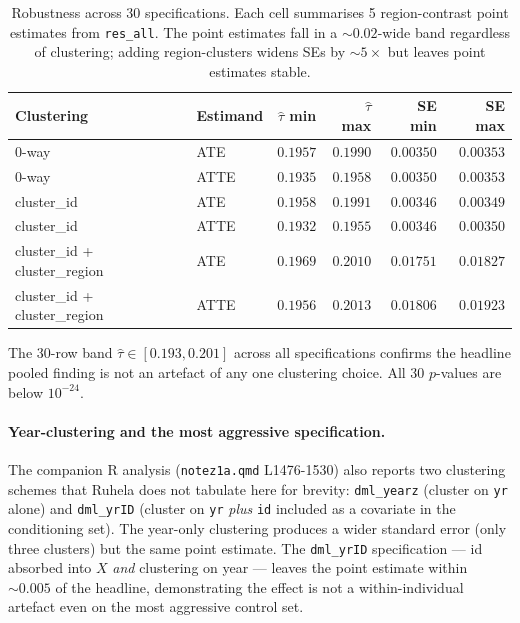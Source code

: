 \documentclass[11pt,a4paper]{article}
\newcommand{\1}{\mathbf{1}}
\theoremstyle{plain}
\theoremstyle{definition}
\begin{document}
\begin{table}[h]
\centering\small
\caption{Robustness across 30 specifications.  Each cell summarises 5
region-contrast point estimates from \texttt{res\_all}.  The point
estimates fall in a $\sim 0.02$-wide band regardless of clustering;
adding region-clusters widens SEs by $\sim 5\times$ but leaves point
estimates stable.}\label{tab:res-all-summary}
\begin{tabular}{llrrrr}
\toprule
Clustering & Estimand & $\hat\tau$ min & $\hat\tau$ max & SE min & SE max\\\midrule
0-way                              & ATE  & $0.1957$ & $0.1990$ & $0.00350$ & $0.00353$\\
0-way                              & ATTE & $0.1935$ & $0.1958$ & $0.00350$ & $0.00353$\\
cluster\_id                        & ATE  & $0.1958$ & $0.1991$ & $0.00346$ & $0.00349$\\
cluster\_id                        & ATTE & $0.1932$ & $0.1955$ & $0.00346$ & $0.00350$\\
cluster\_id + cluster\_region       & ATE  & $0.1969$ & $0.2010$ & $0.01751$ & $0.01827$\\
cluster\_id + cluster\_region       & ATTE & $0.1956$ & $0.2013$ & $0.01806$ & $0.01923$\\
\bottomrule
\end{tabular}
\end{table}

The 30-row band $\widehat\tau \in [0.193, 0.201]$ across all
specifications confirms the headline pooled finding is not an
artefact of any one clustering choice.  All 30 $p$-values are below
$10^{-24}$.

\paragraph{Year-clustering and the most aggressive specification.}
The companion R analysis (\texttt{notez1a.qmd} L1476-1530) also
reports two clustering schemes that Ruhela does not tabulate here for
brevity: \texttt{dml\_yearz} (cluster on \texttt{yr} alone) and
\texttt{dml\_yrID} (cluster on \texttt{yr} \emph{plus}
\texttt{id} included as a covariate in the conditioning set).  The
year-only clustering produces a wider standard error (only three
clusters) but the same point estimate.  The
\texttt{dml\_yrID} specification — id absorbed into $X$ \emph{and}
clustering on year — leaves the point estimate within
$\sim 0.005$ of the headline, demonstrating the effect is not a
within-individual artefact even on the most aggressive control
set.
\end{document}

